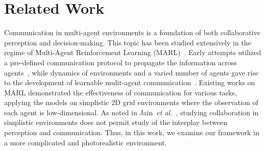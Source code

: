 \section{Related Work}
\label{sec:related_work}

Communication in multi-agent environments is a foundation of both collaborative perception and decision-making. 
This topic has been studied extensively in the regime of Multi-Agent Reinforcement Learning (MARL)~\cite{littman1994markov,schmidhuber1996general,panait2005cooperative}. Early attempts utilized a pre-defined communication protocol to propagate the information across agents~\cite{tan1993multi,zhang2013coordinating,melo2011querypomdp}, while dynamics of environments and a varied number of agents gave rise to the development of learnable mulit-agent communication~\cite{sukhbaatar2016learning,foerster2016learning,battaglia2016interaction,hoshen2017vain,foerster2016dial,peng2017multiagent,jiang2018learning,singh2018learning,kim2018learning,das2019tarmac,pesce2019improving,foerster2018counterfactual,jain2019two,kim2019message}. 
Existing works on MARL demonstrated the effectiveness of communication for various tasks, applying the models on simplistic 2D grid environments where the  observation of each agent is low-dimensional. 
As noted in Jain~\textit{et al.}~\cite{jain2019two}, studying collaboration in simplistic environments does not permit study of the interplay between perception and communication. 
Thus, in this work, we examine our framework in a more complicated and photorealistic environment. 


